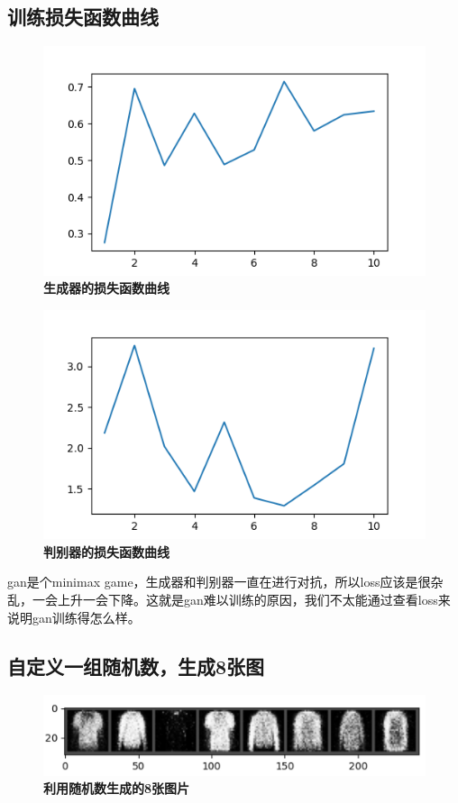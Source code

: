 \documentclass{article}
\begin{document}
\subsection{训练损失函数曲线}
\begin{figure}[H]
   \centering
   \includegraphics[scale = 0.75]{lossG.png}
   \caption{\textbf{生成器的损失函数曲线}}
\end{figure}
\begin{figure}[H]
   \centering
   \includegraphics[scale = 0.75]{lossV.png}
   \caption{\textbf{判别器的损失函数曲线}}
\end{figure}
gan是个minimax game，生成器和判别器一直在进行对抗，所以loss应该是很杂乱，一会上升一会下降。这就是gan难以训练的原因，我们不太能通过查看loss来说明gan训练得怎么样。

\subsection{自定义一组随机数，生成8张图}
\begin{figure}[H]
   \centering
   \includegraphics[scale = 0.75]{11.png}
   \caption{\textbf{利用随机数生成的8张图片}}
\end{figure}
\end{document}
